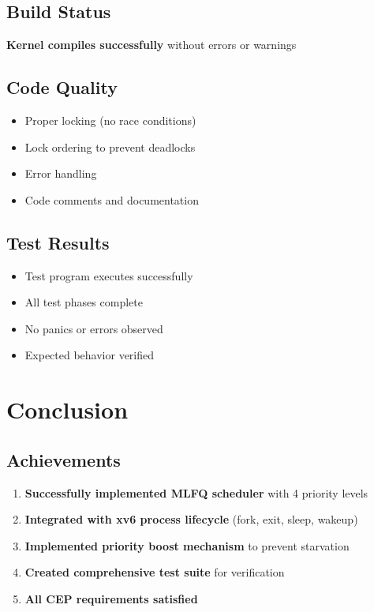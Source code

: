 \documentclass[11pt,a4paper]{article}
\begin{document}
\subsection{Build Status}

\textcolor{green!70!black}{\textbf{Kernel compiles successfully}} without errors or warnings

\subsection{Code Quality}

\begin{itemize}
    \item[\textcolor{green!70!black}{$\checkmark$}] Proper locking (no race conditions)
    \item[\textcolor{green!70!black}{$\checkmark$}] Lock ordering to prevent deadlocks
    \item[\textcolor{green!70!black}{$\checkmark$}] Error handling
    \item[\textcolor{green!70!black}{$\checkmark$}] Code comments and documentation
\end{itemize}

\subsection{Test Results}

\begin{itemize}
    \item[\textcolor{green!70!black}{$\checkmark$}] Test program executes successfully
    \item[\textcolor{green!70!black}{$\checkmark$}] All test phases complete
    \item[\textcolor{green!70!black}{$\checkmark$}] No panics or errors observed
    \item[\textcolor{green!70!black}{$\checkmark$}] Expected behavior verified
\end{itemize}

\section{Conclusion}

\subsection{Achievements}

\begin{enumerate}
    \item \textbf{Successfully implemented MLFQ scheduler} with 4 priority levels
    \item \textbf{Integrated with xv6 process lifecycle} (fork, exit, sleep, wakeup)
    \item \textbf{Implemented priority boost mechanism} to prevent starvation
    \item \textbf{Created comprehensive test suite} for verification
    \item \textbf{All CEP requirements satisfied}
\end{enumerate}
\end{document}
